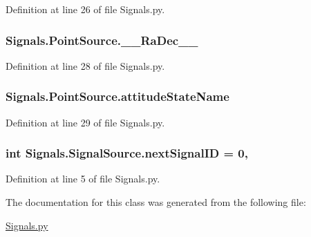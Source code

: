 Definition at line 26 of file Signals.\+py.

\subsubsection[{\texorpdfstring{\+\_\+\+\_\+\+Ra\+Dec\+\_\+\+\_\+}{__RaDec__}}]{\setlength{\rightskip}{0pt plus 5cm}Signals.\+Point\+Source.\+\_\+\+\_\+\+Ra\+Dec\+\_\+\+\_\+\hspace{0.3cm}{\ttfamily [private]}}\hypertarget{classSignals_1_1PointSource_ac876dc0b41dd3da6bb9b8ec9c41e0dd2}{}\label{classSignals_1_1PointSource_ac876dc0b41dd3da6bb9b8ec9c41e0dd2}


Definition at line 28 of file Signals.\+py.

\subsubsection[{\texorpdfstring{attitude\+State\+Name}{attitudeStateName}}]{\setlength{\rightskip}{0pt plus 5cm}Signals.\+Point\+Source.\+attitude\+State\+Name}\hypertarget{classSignals_1_1PointSource_a151f2600c3623d1ca49fb51feb8a1178}{}\label{classSignals_1_1PointSource_a151f2600c3623d1ca49fb51feb8a1178}


Definition at line 29 of file Signals.\+py.

\subsubsection[{\texorpdfstring{next\+Signal\+ID}{nextSignalID}}]{\setlength{\rightskip}{0pt plus 5cm}int Signals.\+Signal\+Source.\+next\+Signal\+ID = 0\hspace{0.3cm}{\ttfamily [static]}, {\ttfamily [inherited]}}\hypertarget{classSignals_1_1SignalSource_abcff0d069f17cb5ebe3eff15b6283a64}{}\label{classSignals_1_1SignalSource_abcff0d069f17cb5ebe3eff15b6283a64}


Definition at line 5 of file Signals.\+py.



The documentation for this class was generated from the following file\+:\begin{DoxyCompactItemize}
\item 
\hyperlink{Signals_8py}{Signals.\+py}\end{DoxyCompactItemize}
